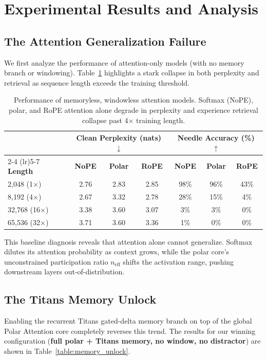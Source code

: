 \documentclass{article} %
\begin{document}
\section{Experimental Results and Analysis}

\subsection{The Attention Generalization Failure}
We first analyze the performance of attention-only models (with no memory branch or windowing). Table~\ref{table:attention_alone} highlights a stark collapse in both perplexity and retrieval as sequence length exceeds the training threshold.

\begin{table}[h]
\centering
\small
\setlength{\tabcolsep}{5pt}
\begin{tabular}{lcccccc}
\toprule
 & \multicolumn{3}{c}{\textbf{Clean Perplexity (nats) $\downarrow$}} & \multicolumn{3}{c}{\textbf{Needle Accuracy (\%) $\uparrow$}} \\
\cmidrule(lr){2-4} \cmidrule(lr){5-7}
\textbf{Length} & \textbf{NoPE} & \textbf{Polar} & \textbf{RoPE} & \textbf{NoPE} & \textbf{Polar} & \textbf{RoPE} \\
\midrule
2,048 (1$\times$)  & 2.76 & 2.83 & 2.85 & 98\% & 96\% & 43\% \\
8,192 (4$\times$)  & 2.67 & 3.32 & 2.78 & 28\% & 15\% & 4\%  \\
32,768 (16$\times$) & 3.38 & 3.60 & 3.07 & 3\%  & 3\%  & 0\%  \\
65,536 (32$\times$) & 3.71 & 3.60 & 3.36 & 1\%  & 0\%  & 0\%  \\
\bottomrule
\end{tabular}
\caption{Performance of memoryless, windowless attention models. Softmax (NoPE), polar, and RoPE attention alone degrade in perplexity and experience retrieval collapse past 4$\times$ training length.}
\label{table:attention_alone}
\end{table}

This baseline diagnosis reveals that attention alone cannot generalize. Softmax dilutes its attention probability as context grows, while the polar core's unconstrained participation ratio $n_{\text{eff}}$ shifts the activation range, pushing downstream layers out-of-distribution.

\subsection{The Titans Memory Unlock}
Enabling the recurrent Titans gated-delta memory branch on top of the global Polar Attention core completely reverses this trend. The results for our winning configuration (\textbf{full polar + Titans memory, no window, no distractor}) are shown in Table~\ref{table:memory_unlock}.
\end{document}
